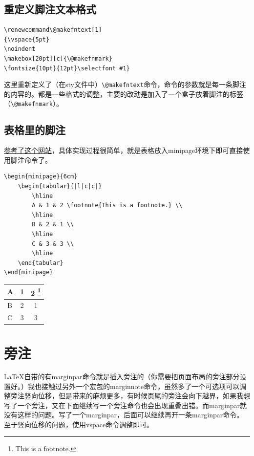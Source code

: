 \documentclass[12pt,oneside]{book}
\begin{document}
\begin{common-format}
\subsection{重定义脚注文本格式}
\begin{Verbatim}
\renewcommand\@makefntext[1]
{\vspace{5pt}
\noindent
\makebox[20pt][c]{\@makefnmark}
\fontsize{10pt}{12pt}\selectfont #1}
\end{Verbatim}

这里重新定义了（在sty文件中）\verb+\@makefntext+命令，命令的参数就是每一条脚注的内容的。都是一些格式的调整，主要的改动是加入了一个盒子放着脚注的标签（\verb+\@makefnmark+）。


\subsection{表格里的脚注}
\href{http://texblog.org/tag/footnote/}{参考了这个网站}，具体实现过程很简单，就是表格放入minipage环境下即可直接使用脚注命令了。

\begin{Verbatim}
\begin{minipage}{6cm}
	\begin{tabular}{|l|c|c|}
		\hline
		A & 1 & 2 \footnote{This is a footnote.} \\
		\hline
		B & 2 & 1 \\
		\hline
		C & 3 & 3 \\
		\hline
	\end{tabular}
\end{minipage}
\end{Verbatim}


\begin{minipage}{6cm}
	\begin{tabular}{|l|c|c|}
		\hline
		A & 1 & 2 \footnote{This is a footnote.} \\
		\hline
		B & 2 & 1 \\
		\hline
		C & 3 & 3 \\
		\hline
	\end{tabular}
\end{minipage}




\section{旁注}
\LaTeX 自带的有marginpar命令就是插入旁注的（你需要把页面布局的旁注部分设置好。）我也接触过另外一个宏包的marginnote命令，虽然多了一个可选项可以调整旁注竖向位移，但是带来的麻烦更多，有时候页尾的旁注会向下越界，如果我想写了一个旁注，又在下面继续写一个旁注命令也会出现重叠出错。而marginpar就没有这样的问题。写了一个marginpar，后面可以继续再开一条marginpar命令。至于竖向位移的问题，使用vspace命令调整即可。


\end{common-format}
\end{document}
